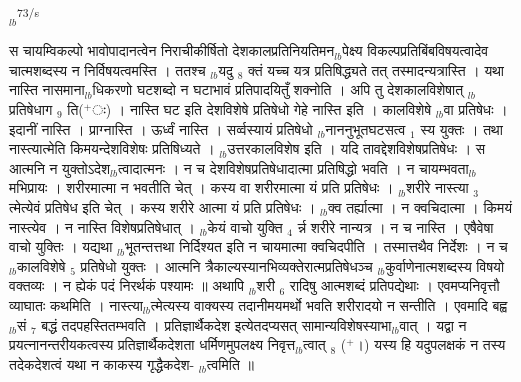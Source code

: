 \documentclass[article,12pt,a4paper]{memoir}%
\newcommand{\add}[1]{($^{+}$#1)}
\newcounter{parCount}
\begin{document}
	  
	  
	  \endgroup
	{\tiny $_{lb}$}\textsuperscript{\textenglish{73/s}}

	  
	  \pstart \leavevmode%
	स चायम्विकल्पो भावोपादानत्वेन निराचीकीर्षितो देशकालप्रतिनियतिमन{\tiny $_{lb}$}पेक्ष्य विकल्पप्रतिबिंबविषयत्वादेव चात्मशब्दस्य न निर्विषयत्वमस्ति । ततश्च {\tiny $_{lb}$}यदु {\tiny $_{8}$} क्तं यच्च यत्र प्रतिषिद्ध्यते तत् तस्मादन्यत्रास्ति । यथा नास्ति नासमाना{\tiny $_{lb}$}धिकरणो घटशब्दो न घटाभावं प्रतिपादयितुँ शक्नोति । अपि तु देशकालविशेषात् {\tiny $_{lb}$}प्रतिषेधाग {\tiny $_{9}$} \leavevmode{} ति\add{ः} । नास्ति घट इति देशविशेषे प्रतिषेधो गेहे नास्ति इति । कालविशेषे {\tiny $_{lb}$}वा प्रतिषेधः । इदानीं नास्ति । प्राग्नास्ति । ऊर्ध्वं नास्ति । सर्व्वस्यायं प्रतिषेधो {\tiny $_{lb}$}नाननुभूतघटसत्व {\tiny $_{1}$} स्य युक्तः । तथा नास्त्यात्मेति किमयन्देशविशेषः प्रतिषिध्यते । {\tiny $_{lb}$}उत्तरकालविशेष इति । यदि तावद्देशविशेषप्रतिषेधः । स आत्मनि न युक्तोऽदेश{\tiny $_{lb}$}त्वादात्मनः । न च देशविशेषप्रतिषेधादात्मा प्रतिषिद्धो भवति । न चायम्भवता{\tiny $_{lb}$}मभिप्रायः । शरीरमात्मा न भवतीति चेत् । कस्य वा शरीरमात्मा यं प्रति प्रतिषेधः । {\tiny $_{lb}$}शरीरे नास्त्या {\tiny $_{3}$} त्मेत्येवं प्रतिषेध इति चेत् । कस्य शरीरे आत्मा यं प्रति प्रतिषेधः । {\tiny $_{lb}$}क्व तर्ह्यात्मा । न क्वचिदात्मा । किमयं नास्त्येव । न नास्ति विशेषप्रतिषेधात् । {\tiny $_{lb}$}केयं वाचो युक्ति {\tiny $_{4}$} र्न्न शरीरे नान्यत्र । न च नास्ति । एषैवेषा वाचो युक्तिः । यद्यथा {\tiny $_{lb}$}भूतन्तत्तथा निर्दिश्यत इति न चायमात्मा क्वचिदपीति । तस्मात्तथैव निर्देशः । न च {\tiny $_{lb}$}कालविशेषे {\tiny $_{5}$} प्रतिषेधो युक्तः । आत्मनि त्रैकाल्यस्यानभिव्यक्तेरात्मप्रतिषेधञ्च {\tiny $_{lb}$}कुर्वाणेनात्मशब्दस्य विषयो वक्तव्यः । न ह्येकं पदं निरर्थकं पश्यामः ॥ अथापि {\tiny $_{lb}$}शरी {\tiny $_{6}$} रादिषु आत्मशब्दं प्रतिपद्येथाः । एवमप्यनिवृत्तौ व्याघातः कथमिति । नास्त्या{\tiny $_{lb}$}त्मेत्यस्य वाक्यस्य तदानीमयमर्थो भवति शरीरादयो न सन्तीति । एवमादि बह्व{\tiny $_{lb}$}सं {\tiny $_{7}$} बद्धं तदपहस्तितम्भवति । प्रतिज्ञार्थैकदेश इत्येतदप्यसत् सामान्यविशेषस्याभा{\tiny $_{lb}$}वात् । यद्वा न प्रयत्नानन्तरीयकत्वस्य प्रतिज्ञार्थैकदेशता धर्मिणमुपलक्ष्य निवृत्त{\tiny $_{lb}$}त्वात् {\tiny $_{8}$} \leavevmode{} \add{।} यस्य हि यदुपलक्षकं न तस्य तदेकदेशत्वं यथा न काकस्य गृद्धैकदेश- {\tiny $_{lb}$}त्वमिति ॥
	{}
	\pend%
      
	    
	    \endnumbering%
	    
\end{document}
